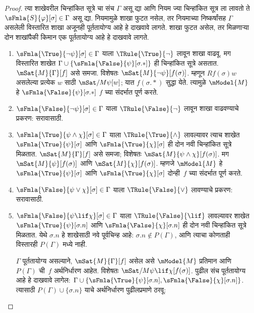 \begin{proof}
त्या शाखेवरील चिन्हांकित सूत्रे
चा संच $\Gamma$ असू द्या आणि
नियम ज्या चिन्हांकित सूत्र
ला लावतो ते
$\sFmla{S}{\varphi}[\sigma] \in \Gamma$
असू द्या. नियमामुळे शाखा फुटत
नसेल, तर नियमाच्या निष्कर्षांसह
$\Gamma$ असलेली विस्तारित शाखा
अजूनही पूर्ततायोग्य आहे हे
दाखवावे लागते. शाखा फुटत
असेल, तर मिळणाऱ्या दोन शाखांपैकी
किमान एक पूर्ततायोग्य आहे हे
दाखवावे लागते.
\begin{enumerate}
\item $\sFmla{\True}{\lnot \psi}[\sigma] \in \Gamma$
  याला $\TRule{\True}{\lnot}$ लावून
  शाखा वाढवू. मग विस्तारित
  शाखेत $\Gamma \cup
  \{\sFmla{\False}{\psi}[\sigma.{*}]\}$
  ही चिन्हांकित सूत्रे असतात.
  $\mSat{M}{\Gamma}[f]$ असे समजा.
  विशेषतः
  $\mSat{M}{\lnot \psi}[f(\sigma)]$.
  म्हणून $Rf(\sigma)w$ असलेल्या
  प्रत्येक $w$ साठी
  $\mSat/{M}{\psi}[w]$; यात
  $f(\sigma.{*})$ सुद्धा येते.
  त्यामुळे $\mModel{M}$ हे
  $\sFmla{\False}{\psi}[\sigma.{*}]$
  $f$ च्या संदर्भात पूर्ण करते.
\item $\sFmla{\False}{\lnot \psi}[\sigma] \in \Gamma$
  याला $\TRule{\False}{\lnot}$
  लावून शाखा वाढवण्याचे प्रकरण:
  सरावासाठी.
\item $\sFmla{\True}{\psi \land \chi}[\sigma] \in \Gamma$
  याला $\TRule{\True}{\land}$
  लावल्यावर त्याच शाखेत
  $\sFmla{\True}{\psi}[\sigma]$
  आणि $\sFmla{\True}{\chi}[\sigma]$
  ही दोन नवी चिन्हांकित सूत्रे
  मिळतात. $\mSat{M}{\Gamma}[f]$
  असे समजा; विशेषतः
  $\mSat{M}{\psi \land
    \chi}[f(\sigma)]$. मग
  $\mSat{M}{\psi}[f(\sigma)]$
  आणि $\mSat{M}{\chi}[f(\sigma)]$.
  म्हणजे $\mModel{M}$ हे
  $\sFmla{\True}{\psi}[\sigma]$
  आणि $\sFmla{\True}{\chi}[\sigma]$
  दोन्ही~$f$ च्या संदर्भात
  पूर्ण करते.
\item $\sFmla{\False}{\psi \lor \chi}[\sigma] \in \Gamma$
  याला $\TRule{\False}{\lor}$
  लावण्याचे प्रकरण: सरावासाठी.
\item $\sFmla{\False}{\psi \lif \chi}[\sigma] \in \Gamma$
  याला $\TRule{\False}{\lif}$
  लावल्यावर शाखेत
  $\sFmla{\True}{\psi}[\sigma.n]$
  आणि $\sFmla{\False}{\chi}[\sigma.n]$
  ही दोन नवी चिन्हांकित सूत्रे
  मिळतात. येथे $\sigma.n$
  हे शाखेसाठी नवे पूर्वचिन्ह आहे: $\sigma.n\notin P(\Gamma)$,
  आणि त्याचा कोणताही विस्तारही $P(\Gamma)$ मध्ये नाही.

  $\Gamma$ पूर्ततायोग्य असल्याने,
  $\mSat{M}{\Gamma}[f]$ असेल
  असे $\mModel{M}$ प्रतिमान
  आणि $P(\Gamma)$ ची~$f$
  अर्थनिर्धारण आहेत. विशेषतः
  $\mSat/{M}{\psi \lif \chi}[f(\sigma)]$.
  पुढील संच पूर्ततायोग्य आहे हे
  दाखवावे लागेल:
  $\Gamma \cup
  \{\sFmla{\True}{\psi}[\sigma.n],
  \sFmla{\False}{\chi}[\sigma.n]\}$.
  त्यासाठी $P(\Gamma)
  \cup \{\sigma.n\}$
  याचे अर्थनिर्धारण पुढीलप्रमाणे
  ठरवू:


\end{enumerate}
\end{proof}
